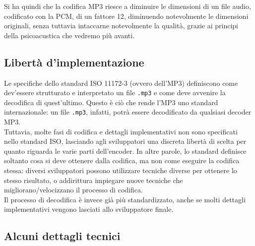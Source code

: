 			Si ha quindi che la codifica MP3 riesce a diminuire le dimensioni di un file audio, codificato con la PCM, di un fattore 12, diminuendo notevolmente le dimensioni originali, senza tuttavia intaccarne notevolmente la qualità, grazie ai principi della psicoacustica che vedremo più avanti.
			
		\subsection{Libertà d'implementazione} \label{subsec:libertà_implementazione}
			
			Le specifiche dello standard ISO 11172-3 (ovvero dell'MP3) definiscono come dev'essere strutturato e interpretato un file \texttt{.mp3} e come deve avvenire la decodifica di quest'ultimo. Questo è ciò che rende l'MP3 uno standard internazionale: un file \texttt{.mp3}, infatti, potrà essere decodificato da qualsiasi decoder MP3.\\
			Tuttavia, molte fasi di codifica e dettagli implementativi non sono specificati nello standard ISO, lasciando agli sviluppatori una discreta libertà di scelta per quanto riguarda le varie parti dell'encoder. In altre parole, lo standard definisce soltanto cosa si deve ottenere dalla codifica, ma non come eseguire la codifica stessa: diversi sviluppatori possono utilizzare tecniche diverse per ottenere lo stesso risultato, o addirittura impiegare nuove tecniche che migliorano/velocizzano il processo di codifica.\\
			Il processo di decodifica è invece già più standardizzato, anche se molti dettagli implementativi vengono lasciati allo sviluppatore finale.
			
		\subsection{Alcuni dettagli tecnici} \label{subsec:dettagli_tecnici} 
			

